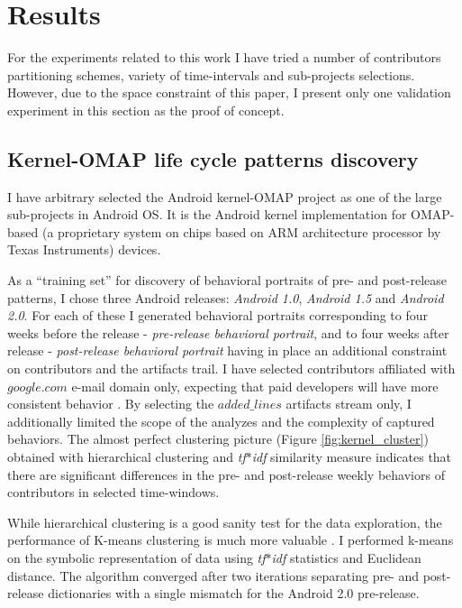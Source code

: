 \documentclass[conference]{worldcomp}
\begin{document}
\section{Results}
For the experiments related to this work I have tried a number of contributors 
partitioning schemes, variety of time-intervals and sub-projects selections. 
However, due to the space constraint of this paper, 
I present only one validation experiment in this section as the proof of concept.

\subsection{Kernel-OMAP life cycle patterns discovery}
I have arbitrary selected the Android kernel-OMAP project as one of the large sub-projects in Android OS. 
It is the Android kernel implementation for OMAP-based (a proprietary system on chips based on 
ARM architecture processor by Texas Instruments) devices.

As a ``training set'' for discovery of behavioral portraits of pre- and post-release patterns, 
I chose three Android releases: \textit{Android 1.0}, \textit{Android 1.5} and \textit{Android 2.0}. 
For each of these I generated behavioral portraits corresponding to four weeks before the 
release - \textit{pre-release behavioral portrait}, 
and to four weeks after release - \textit{post-release behavioral portrait}
having in place an additional constraint on contributors and the artifacts trail. 
I have selected contributors affiliated with $google.com$ e-mail domain only, expecting
that paid developers will have more consistent behavior \cite{citeulike:10392277}.
By selecting the $added\_lines$ artifacts stream only, I additionally limited the scope of the
analyzes and the complexity of captured behaviors.
The almost perfect clustering picture (Figure \ref{fig:kernel_cluster}) 
obtained with hierarchical clustering and \textit{tf$\ast$idf} similarity measure indicates that 
there are significant differences 
in the pre- and post-release weekly behaviors of contributors in selected time-windows.

While hierarchical clustering is a good sanity test for the data exploration, the performance of K-means 
clustering is much more valuable \cite{citeulike:3562}. I performed k-means on the symbolic 
representation of data using \textit{tf$\ast$idf} statistics and Euclidean distance. The algorithm converged after two
iterations separating pre- and post-release dictionaries with a single mismatch for the Android 2.0 pre-release.
\end{document}
